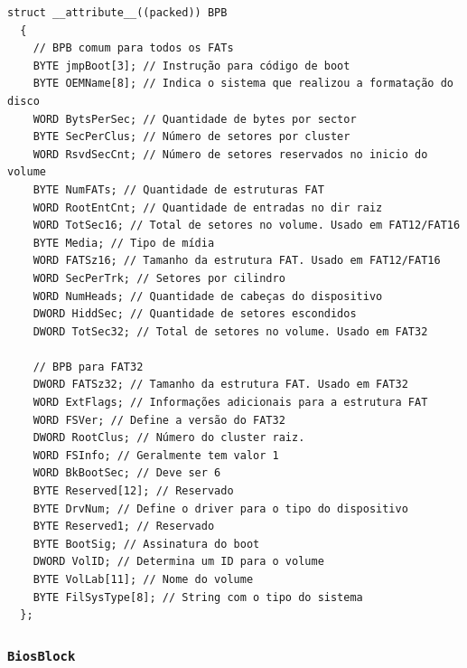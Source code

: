 \documentclass[
    12pt,				%
    oneside,   	        %
    a4paper,			%
    english,			%
    french,				%
    spanish,			%
    brazil,				%
    ]{pacotes/abntex2}
\begin{document}
\begin{lstlisting}[caption={Estrutura que representa o BPB encontrado no volume FAT}, label={lst:bpb}]
  struct __attribute__((packed)) BPB
  {
    // BPB comum para todos os FATs
    BYTE jmpBoot[3]; // Instrução para código de boot
    BYTE OEMName[8]; // Indica o sistema que realizou a formatação do disco
    WORD BytsPerSec; // Quantidade de bytes por sector
    BYTE SecPerClus; // Número de setores por cluster
    WORD RsvdSecCnt; // Número de setores reservados no inicio do volume
    BYTE NumFATs; // Quantidade de estruturas FAT
    WORD RootEntCnt; // Quantidade de entradas no dir raiz
    WORD TotSec16; // Total de setores no volume. Usado em FAT12/FAT16
    BYTE Media; // Tipo de mídia
    WORD FATSz16; // Tamanho da estrutura FAT. Usado em FAT12/FAT16
    WORD SecPerTrk; // Setores por cilindro
    WORD NumHeads; // Quantidade de cabeças do dispositivo
    DWORD HiddSec; // Quantidade de setores escondidos
    DWORD TotSec32; // Total de setores no volume. Usado em FAT32

    // BPB para FAT32
    DWORD FATSz32; // Tamanho da estrutura FAT. Usado em FAT32
    WORD ExtFlags; // Informações adicionais para a estrutura FAT
    WORD FSVer; // Define a versão do FAT32
    DWORD RootClus; // Número do cluster raiz.
    WORD FSInfo; // Geralmente tem valor 1
    WORD BkBootSec; // Deve ser 6
    BYTE Reserved[12]; // Reservado
    BYTE DrvNum; // Define o driver para o tipo do dispositivo
    BYTE Reserved1; // Reservado
    BYTE BootSig; // Assinatura do boot
    DWORD VolID; // Determina um ID para o volume
    BYTE VolLab[11]; // Nome do volume
    BYTE FilSysType[8]; // String com o tipo do sistema
  };
\end{lstlisting}

\subsubsection{\texttt{BiosBlock}}
\label{subsubsec:bios_block}
\end{document}
